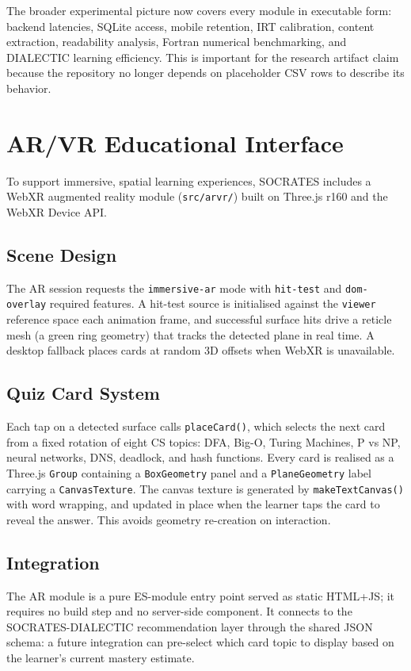 \documentclass[conference]{IEEEtran}
\begin{document}
The broader experimental picture now covers every module in executable form: backend latencies, SQLite access, mobile retention, IRT calibration, content extraction, readability analysis, Fortran numerical benchmarking, and DIALECTIC learning efficiency. This is important for the research artifact claim because the repository no longer depends on placeholder CSV rows to describe its behavior.

\section{AR/VR Educational Interface}
To support immersive, spatial learning experiences, SOCRATES includes a WebXR augmented reality module (\texttt{src/arvr/}) built on Three.js r160 and the WebXR Device API.

\subsection{Scene Design}
The AR session requests the \texttt{immersive-ar} mode with \texttt{hit-test} and \texttt{dom-overlay} required features. A hit-test source is initialised against the \texttt{viewer} reference space each animation frame, and successful surface hits drive a reticle mesh (a green ring geometry) that tracks the detected plane in real time. A desktop fallback places cards at random 3D offsets when WebXR is unavailable.

\subsection{Quiz Card System}
Each tap on a detected surface calls \texttt{placeCard()}, which selects the next card from a fixed rotation of eight CS topics: DFA, Big-O, Turing Machines, P vs NP, neural networks, DNS, deadlock, and hash functions. Every card is realised as a Three.js \texttt{Group} containing a \texttt{BoxGeometry} panel and a \texttt{PlaneGeometry} label carrying a \texttt{CanvasTexture}. The canvas texture is generated by \texttt{makeTextCanvas()} with word wrapping, and updated in place when the learner taps the card to reveal the answer. This avoids geometry re-creation on interaction.

\subsection{Integration}
The AR module is a pure ES-module entry point served as static HTML+JS; it requires no build step and no server-side component. It connects to the SOCRATES-DIALECTIC recommendation layer through the shared JSON schema: a future integration can pre-select which card topic to display based on the learner's current mastery estimate.
\end{document}
